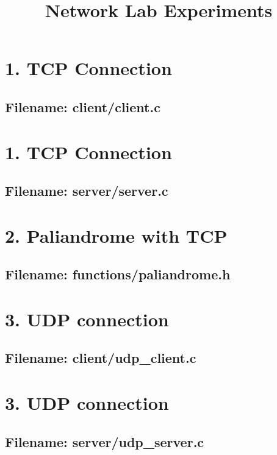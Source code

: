\documentclass{article}
\title{Network Lab Experiments}
\author{}
\date{}
\begin{document}
\maketitle

\newpage
\section*{1. TCP Connection}
\subsection*{Filename: client/client.c}


\newpage
\section*{1. TCP Connection}
\subsection*{Filename: server/server.c}


\newpage
\section*{2. Paliandrome with TCP}
\subsection*{Filename: functions/paliandrome.h}


\newpage
\section*{3. UDP connection}
\subsection*{Filename: client/udp\_client.c}


\newpage
\section*{3. UDP connection}
\subsection*{Filename: server/udp\_server.c}

\end{document}
